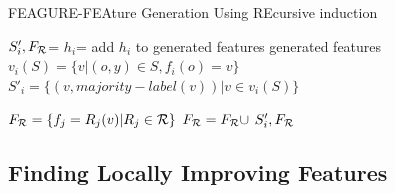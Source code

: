 \documentclass{article}
\theoremstyle{definition}
\begin{document}
\begin{algorithm}[H]
	\caption{FEAGURE-FEAture Generation Using REcursive induction}
	\label{code-creating-prob}
	\small
	\begin{algorithmic}
		\State $S'_i,F_{\cal R}$=  %
		\State $h_i$=  
		\State add $h_i$ to generated features
		\EndFor
		\State \Return generated features
		\EndFunction
		\State 
		\State $v_i(S) = \{v | (o,y) \in S, f_{i}(o)=v\}$
		\State $S'_i = \{ (v, majority-label(v)) | v \in v_i(S) \}$ 
		
		\State $F_{\cal R}=\{f_{j}=R_j(v)| R_j\in{\cal R}\}$
		\State $F_{\cal R}=F_{\cal R}\cup$
		\EndIf
		\State \Return $S'_i, F_{\cal R}$ 
		\EndFunction
		
	\end{algorithmic}
\end{algorithm}



\subsection{Finding Locally Improving Features} \label{tree_usage}
\end{document}
